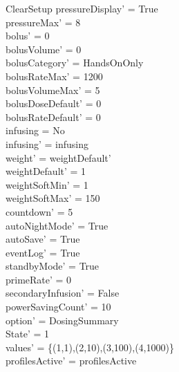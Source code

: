 \begin{schema}{ClearSetup}
	pressureDisplay' = True\\
	pressureMax' = 8\\
	bolus' = 0\\
	bolusVolume' = 0\\
	bolusCategory' = HandsOnOnly\\
	bolusRateMax' = 1200\\
	bolusVolumeMax' = 5\\
	bolusDoseDefault' = 0\\
	bolusRateDefault' = 0\\
	infusing = No\\
	infusing' = infusing\\
	weight' = weightDefault'\\
	weightDefault' = 1\\
	\pagebreak
	weightSoftMin' = 1\\
	weightSoftMax' = 150\\
	countdown' = 5\\
	autoNightMode' = True\\
	autoSave' = True\\
	eventLog' = True\\
	standbyMode' = True\\
	primeRate' = 0\\
	secondaryInfusion' = False\\
	powerSavingCount' = 10\\
	option' = DosingSummary\\
	State' = 1\\
	values' = \{(1,1),(2,10),(3,100),(4,1000)\}\\
profilesActive' = profilesActive	 
\end{schema}

